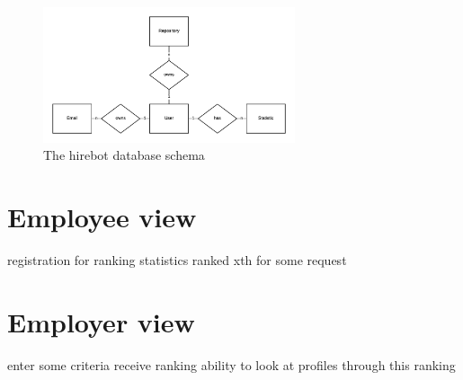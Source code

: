 \begin{figure}
  \centering
  \includegraphics[width=20em]{gfx/schema.png}
  \caption{The hirebot database schema}
  \label{fig:schema}
\end{figure}

\section{Employee view}
registration for ranking
statistics
ranked xth for some request

\section{Employer view}
enter some criteria
receive ranking
ability to look at profiles through this ranking
